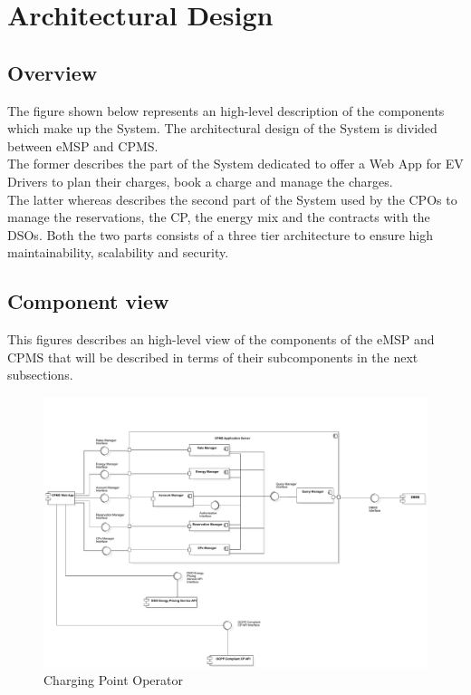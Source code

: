 \section{Architectural Design}
\subsection{Overview}
The figure shown below represents an high-level description of the components which make up the System.
The architectural design of the System is divided between eMSP and CPMS. \\
The former describes the part of the System dedicated to offer a Web App for 
EV Drivers to plan their charges, book a charge and manage the charges. \\
The latter whereas describes the second part of the System used by the CPOs 
to manage the reservations, the CP, the energy mix and the contracts with the DSOs.
Both the two parts consists of a three tier architecture to ensure high maintainability, scalability and security. 


\subsection{Component view}
This figures describes an high-level view of the components of the eMSP and CPMS that will be described in terms of their subcomponents in the next subsections.

\begin{figure}[H]
    \centering
    \includegraphics[scale=0.38]{src/ComponentDiagram/CPOdiagram.pdf}
    \caption{Charging Point Operator}
\end{figure} \vspace{1cm}

